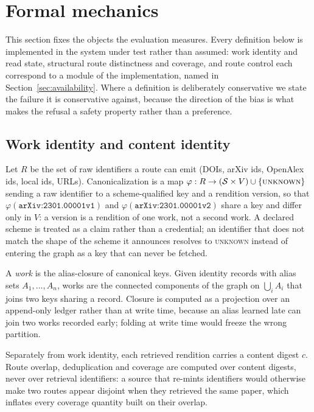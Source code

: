 \section{Formal mechanics}
\label{sec:formalism}

This section fixes the objects the evaluation measures. Every definition below is
implemented in the system under test rather than assumed: work identity and read
state, structural route distinctness and coverage, and route control each correspond to a
module of the implementation, named in Section~\ref{sec:availability}. Where a
definition is deliberately conservative we state the failure it is conservative
against, because the direction of the bias is what makes the refusal a safety
property rather than a preference.

\subsection{Work identity and content identity}

Let $R$ be the set of raw identifiers a route can emit (DOIs, arXiv ids,
OpenAlex ids, local ids, URLs). Canonicalization is a map
$\varphi: R \rightarrow (\mathcal{S} \times V) \cup \{\textsc{unknown}\}$ sending a raw identifier to a
scheme-qualified key and a rendition version, so that
$\varphi(\texttt{arXiv:2301.00001v1})$ and $\varphi(\texttt{arXiv:2301.00001v2})$
share a key and differ only in $V$: a version is a rendition of one work, not a
second work. A declared scheme is treated as a claim rather than a credential;
an identifier that does not match the shape of the scheme it announces resolves
to \textsc{unknown} instead of entering the graph as a key that can never be
fetched.

A \emph{work} is the alias-closure of canonical keys. Given identity records
with alias sets $A_1,\dots,A_n$, works are the connected components of the graph
on $\bigcup_i A_i$ that joins two keys sharing a record. Closure is computed as a
projection over an append-only ledger rather than at write time, because an alias
learned late can join two works recorded early; folding at write time would
freeze the wrong partition.

Separately from work identity, each retrieved rendition carries a content digest
$c$. Route overlap, deduplication and coverage are computed over content digests,
never over retrieval identifiers: a source that re-mints identifiers would
otherwise make two routes appear disjoint when they retrieved the same paper,
which inflates every coverage quantity built on their overlap.


